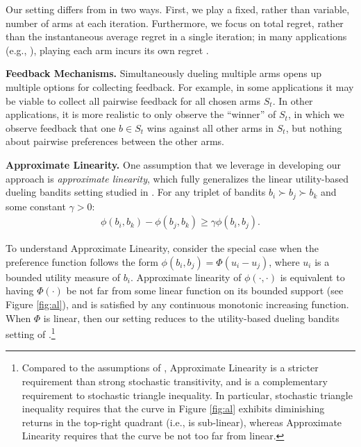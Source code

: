 Our setting differs from \citet{brost2016multi} in two ways.  First, we play a fixed, rather than variable, number of arms at each iteration. Furthermore, we focus on total regret, rather than the instantaneous average regret in a single iteration; in many applications (e.g., \citet{sui2014clinical}), playing each arm incurs its own regret .

\textbf{Feedback Mechanisms.} Simultaneously dueling multiple arms opens up multiple options for collecting feedback. For example, in some applications it may be viable to collect all pairwise feedback for all chosen arms  $S_t$.  In other applications, it is more realistic to only observe the ``winner'' of $S_t$, in which we observe feedback that one $b\in S_t$ wins against all other arms in $S_t$, but nothing about pairwise preferences between the other arms.  %





\textbf{Approximate Linearity.}
One assumption that we leverage in developing our approach is \textit{approximate linearity}, which fully generalizes the linear utility-based dueling bandits setting studied in \citet{ailon2014reducing}.
For any triplet of bandits $b_i \succ b_j \succ b_k$ and some constant $\gamma > 0$: 
\begin{eqnarray}
\phi(b_i,b_k) - \phi(b_j,b_k) \geq \gamma\phi(b_i,b_j).
\label{eqn:al}
\end{eqnarray}

To understand Approximate Linearity, consider the special case when the preference function follows the form $\phi(b_i, b_j) = \Phi(u_i - u_j)$, where $u_i$ is a bounded utility measure of $b_i$. Approximate linearity of $\phi(\cdot, \cdot)$ is equivalent to having $\Phi(\cdot)$ be not far from some linear function on its bounded support (see Figure \ref{fig:al}), and is satisfied by any continuous monotonic increasing function.  When $\Phi$ is linear, then our setting reduces to the utility-based dueling bandits setting of \citet{ailon2014reducing}.\footnote{Compared to the assumptions of \cite{yue2012k}, Approximate Linearity is a stricter requirement than strong stochastic transitivity, and is a complementary requirement to stochastic triangle inequality. In particular, stochastic triangle inequality requires that the curve in Figure \ref{fig:al} exhibits diminishing returns in the top-right quadrant (i.e., is sub-linear), whereas Approximate Linearity requires that the curve be not too far from linear.}



